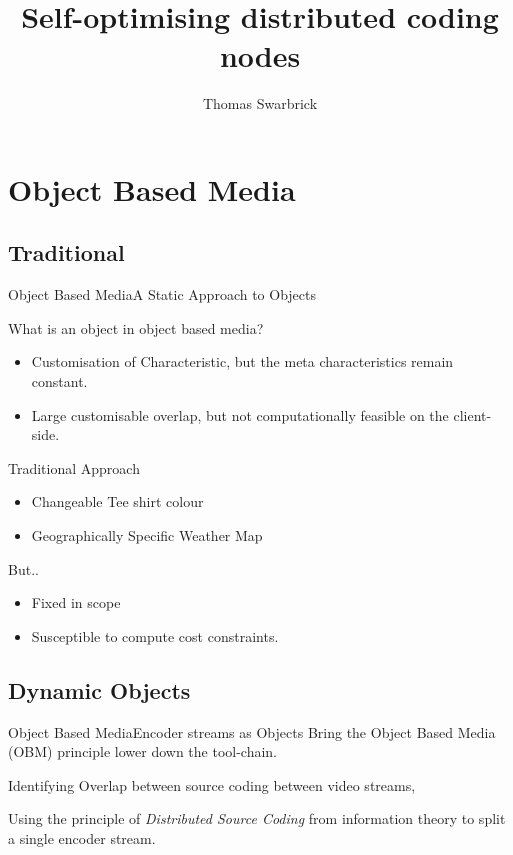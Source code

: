\documentclass{beamer}
\title{Self-optimising distributed coding nodes}
\author{Thomas Swarbrick}
\begin{document}
\maketitle
\section{Object Based Media}
\subsection{Traditional}
\begin{frame}[t]{Object Based Media}{A Static Approach to Objects}
  \begin{alertblock}{What is an object in object based media?}
    \begin{itemize}
\item Customisation of Characteristic, but the meta characteristics remain constant.
      \item Large customisable overlap, but not computationally feasible on the client-side.
    \end{itemize}

  \end{alertblock}
  \pause
  \begin{exampleblock}{Traditional Approach}
    \begin{itemize}
\item Changeable Tee shirt colour
\item Geographically Specific Weather Map
    \end{itemize}

  \end{exampleblock}
  \pause
  But..
  \pause
    \begin{itemize}
\item Fixed in scope
      \item Susceptible to compute cost constraints.
    \end{itemize}
    \pause

\end{frame}
  \subsection{Dynamic Objects}
  \begin{frame}[t]{Object Based Media}{Encoder streams as Objects}
    Bring the Object Based Media (OBM) principle lower down the tool-chain.

    Identifying Overlap between source coding between video streams,

    Using the principle of \emph{Distributed Source Coding} from information theory to split a single encoder stream.

  \end{frame}
\end{document}
